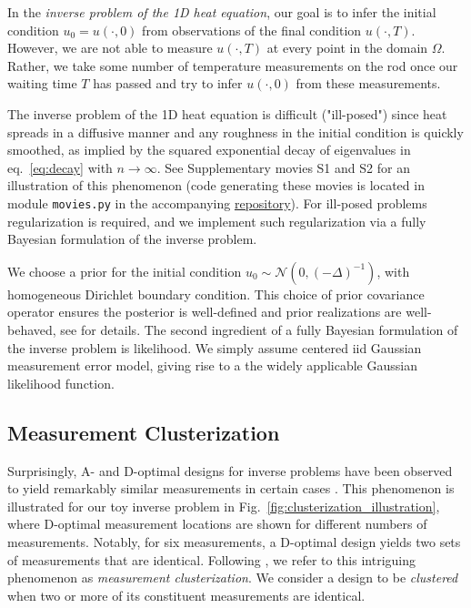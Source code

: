 \documentclass[ba]{imsart}
\theoremstyle{plain}
\theoremstyle{definition}
\theoremstyle{remark}
\begin{document}
In the \emph{inverse problem of the 1D heat equation}, our goal is to
infer the initial condition $u_0 = u(\cdot, 0)$ from observations of
the final condition $u(\cdot, T)$. However, we are not able to measure
$u(\cdot, T)$ at every point in the domain $\Omega$. Rather, we take
some number of temperature measurements on the rod once our waiting
time $T$ has passed and try to infer $u(\cdot, 0)$ from these
measurements.

The inverse problem of the 1D heat equation is difficult ("ill-posed")
since heat spreads in a diffusive manner and any roughness in the
initial condition is quickly smoothed, as implied by the squared
exponential decay of eigenvalues in eq.~\eqref{eq:decay} with
$n\to\infty$. See Supplementary movies S1 and S2 for an illustration
of this phenomenon (code generating these movies is located in module
\texttt{movies.py} in the accompanying
\href{https://github.com/yairdaon/OED}{repository}). For ill-posed
problems regularization is required, and we implement such
regularization via a fully Bayesian formulation of the inverse
problem.

We choose a prior for the initial condition $u_0 \sim \mathcal{N}(0,
(-\Delta)^{-1})$, with homogeneous Dirichlet boundary condition. This
choice of prior covariance operator ensures the posterior is
well-defined and prior realizations are well-behaved, see
\cite[Theorem 3.1 and Lemma 6.25]{Stuart10} for details. The second
ingredient of a fully Bayesian formulation of the inverse problem is
likelihood. We simply assume centered iid Gaussian measurement error
model, giving rise to a the widely applicable Gaussian likelihood
function.


\subsection{Measurement Clusterization}
Surprisingly, A- and D-optimal designs for inverse problems have been
observed to yield remarkably similar measurements in certain cases
\cite{fedorovDesignSpatialExperiments1996, nyberg2012, fedorov1997,
  Ucinski05, neitzel2019sparse}. This phenomenon is illustrated for
our toy inverse problem in Fig.~\ref{fig:clusterization_illustration},
where D-optimal measurement locations are shown for different numbers
of measurements. Notably, for six measurements, a D-optimal design
yields two sets of measurements that are identical. Following
\cite{Ucinski05}, we refer to this intriguing phenomenon as
\emph{measurement clusterization}. We consider a design to be
\emph{clustered} when two or more of its constituent measurements are
identical.
\end{document}
